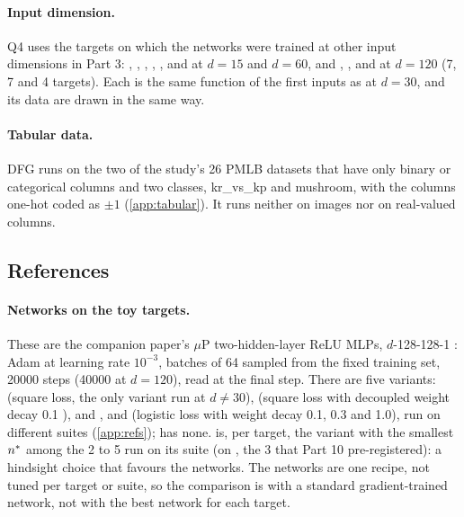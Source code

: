 \paragraph{Input dimension.} Q4 uses the  targets on which the networks were trained at other input dimensions in Part 3: , , , , ,  and  at $d=15$ and $d=60$, and , ,  and  at $d=120$ (7, 7 and 4 targets). Each is the same function of the first inputs as at $d=30$, and its data are drawn in the same way.

\paragraph{Tabular data.} DFG runs on the two of the study's 26 PMLB datasets \cite{olson2017pmlb} that have only binary or categorical columns and two classes, kr\_vs\_kp and mushroom, with the columns one-hot coded as $\pm1$ (\cref{app:tabular}). It runs neither on images nor on real-valued columns.

\subsection{References}\label{sec:refs}

\paragraph{Networks on the toy targets.} These are the companion paper's $\mu$P two-hidden-layer ReLU MLPs, $d$-128-128-1 \cite{gdcircuit2026,yang2021feature}: Adam \cite{kingma2015adam} at learning rate $10^{-3}$, batches of 64 sampled from the fixed training set, 20000 steps (40000 at $d=120$), read at the final step. There are five variants:  (square loss, the only variant run at $d\ne30$),  (square loss with decoupled weight decay 0.1 \cite{loshchilov2019adamw}), and ,  and  (logistic loss with weight decay 0.1, 0.3 and 1.0), run on different suites (\cref{app:refs});  has none.  is, per target, the variant with the smallest $n^{*}$ among the 2 to 5 run on its suite (on , the 3 that Part 10 pre-registered): a hindsight choice that favours the networks. The networks are one recipe, not tuned per target or suite, so the comparison is with a standard gradient-trained network, not with the best network for each target.

